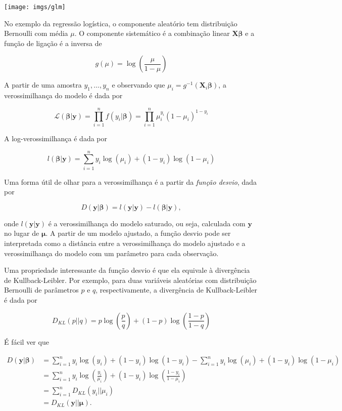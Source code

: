 \documentclass[12pt,]{report}
\begin{document}
\begin{center}\texttt{[image: imgs/glm]} \end{center}

No exemplo da regressão logística, o componente aleatório tem
distribuição Bernoulli com média \(\mu\). O componente sistemático é a
combinação linear \(\mathbf X \boldsymbol \beta\) e a função de ligação
é a inversa de

\[
g(\mu) = \log\left(\frac{\mu}{1-\mu}\right)
\]

A partir de uma amostra \(y_1, \dots, y_n\) e observando que
\(\mu_i = g^{-1}(\mathbf X_i\boldsymbol\beta)\), a verossimilhança do
modelo é dada por

\[
\mathcal L(\boldsymbol \beta|\mathbf y) = \prod_{i=1}^n f(y_i|\boldsymbol\beta) = \prod_{i=1}^n\mu_i^{y_i}(1-\mu_i)^{1-y_i}
\]

A log-verossimilhança é dada por

\[
l(\boldsymbol \beta|\mathbf y) = \sum_{i=1}^n y_i\log(\mu_i) + (1-y_i)\log(1-\mu_i)
\]

Uma forma útil de olhar para a verossimilhança é a partir da
\emph{função desvio}, dada por

\[
D(\mathbf y|\boldsymbol \beta) = l(\mathbf y|\mathbf y) - l(\boldsymbol \beta|\mathbf y),
\]

onde \(l(\mathbf y|\mathbf y)\) é a verossimilhança do modelo saturado,
ou seja, calculada com \(\mathbf y\) no lugar de \(\boldsymbol \mu\). A
partir de um modelo ajustado, a função desvio pode ser interpretada como
a distância entre a verossimilhança do modelo ajustado e a
verossimilhança do modelo com um parâmetro para cada observação.

Uma propriedade interessante da função desvio é que ela equivale à
divergência de Kullback-Leibler. Por exemplo, para duas variáveis
aleatórias com distribuição Bernoulli de parâmetros \(p\) e \(q\),
respectivamente, a divergência de Kullback-Leibler é dada por

\[
D_{KL}(p||q) = p\log\left(\frac p q\right) + (1-p)\log\left(\frac{1-p}{1-q}\right)
\]

É fácil ver que

\[
\begin{aligned}
D(\mathbf y|{ \boldsymbol \beta}) &= \sum_{i=1}^n y_i\log(y_i) + (1-y_i)\log(1-y_i) - \sum_{i=1}^n y_i\log(\mu_i) + (1-y_i)\log(1-\mu_i) \\
&=\sum_{i=1}^ny_i\log\left(\frac{y_i}{\mu_i}\right) + (1-y_i)\log\left(\frac{1-y_i}{1-\mu_i}\right) \\
&= \sum_{i=1}^n D_{KL}(y_i||\mu_i) \\
&= D_{KL}(\mathbf y||{\boldsymbol\mu}).
\end{aligned}
\]
\end{document}
